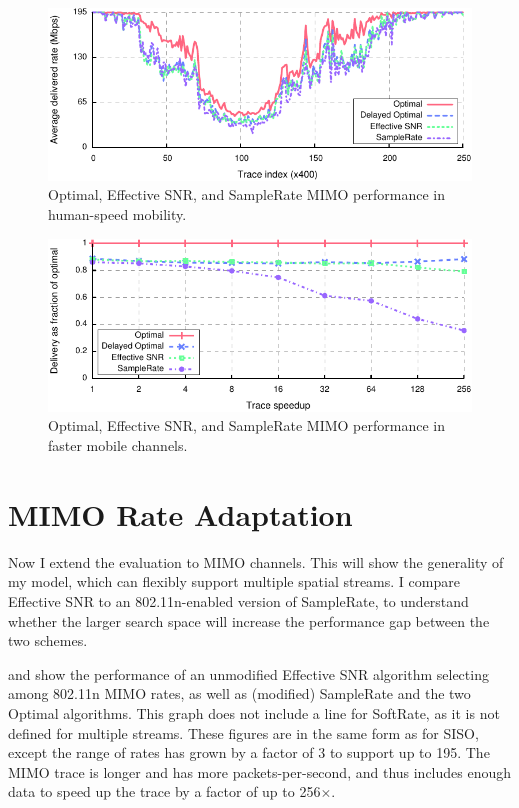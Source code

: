 \begin{figure}[t]
      \centering
      \includegraphics[width=\textwidth]{figures/rate/mimo_rate_time.pdf}
      \caption[MIMO algorithm performance in human-speed mobility]{\label{fig:mimo_eff_snr_time} Optimal, Effective SNR, and SampleRate MIMO performance in human-speed mobility.}
\end{figure}

\begin{figure}[ht]
      \centering
      \includegraphics[width=\textwidth]{figures/rate/mimo_rate_skip_ratio.pdf}
      \caption[MIMO algorithm performance in fast mobile channels]{\label{fig:mimo_eff_snr_speedup} Optimal, Effective SNR, and SampleRate MIMO performance in faster mobile channels.}
\end{figure}

\section{MIMO Rate Adaptation}
Now I extend the evaluation to MIMO channels. This will show the generality of my model, which can flexibly support multiple spatial streams. I compare Effective SNR to an 802.11n-enabled version of SampleRate, to understand whether the larger search space will increase the performance gap between the two schemes.

 and  show the performance of an unmodified Effective SNR algorithm selecting among 802.11n MIMO rates, as well as (modified) SampleRate and the two Optimal algorithms. This graph does not include a line for SoftRate, as it is not defined for multiple streams.
These figures are in the same form as for SISO, except the range of rates has grown by a factor of 3 to support up to 195\Mbps. The MIMO trace is longer and has more packets-per-second, and thus includes enough data to speed up the trace by a factor of up to 256$\times$.

